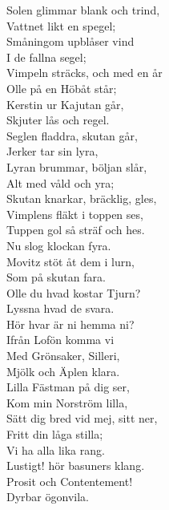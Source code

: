 \documentclass[a6paper, 10pt, twoside]{article}
\begin{document}
\noindent
\begin{center}
\end{center}
\begin{lyrics}
\vspace{-5pt}
Solen glimmar blank och trind,\\
Vattnet likt en spegel;\\
Småningom upblåser vind\\
I de fallna segel;\\
Vimpeln sträcks, och med en år\\
Olle på en Höbåt står;\\
Kerstin ur Kajutan går,\\
Skjuter lås och regel.
\vspace{5pt}\\
Seglen fladdra, skutan går,\\
Jerker tar sin lyra,\\
Lyran brummar, böljan slår,\\
Alt med våld och yra;\\
Skutan knarkar, bräcklig, gles,\\
Vimplens fläkt i toppen ses,\\
Tuppen gol så sträf och hes.\\
Nu slog klockan fyra.
\vspace{5pt}\\
Movitz stöt åt dem i lurn,\\
Som på skutan fara.\\
Olle du hvad kostar Tjurn?\\
Lyssna hvad de svara.\\
Hör hvar är ni hemma ni?\\
Ifrån Lofön komma vi\\
Med Grönsaker, Silleri,\\
Mjölk och Äplen klara.
\vspace{5pt}\\
Lilla Fästman på dig ser,\\
Kom min Norström lilla,\\
Sätt dig bred vid mej, sitt ner,\\
Fritt din låga stilla;\\
Vi ha alla lika rang.\\
Lustigt! hör basuners klang.\\
Prosit och Contentement!\\
Dyrbar ögonvila.


\end{lyrics}
\end{document}
